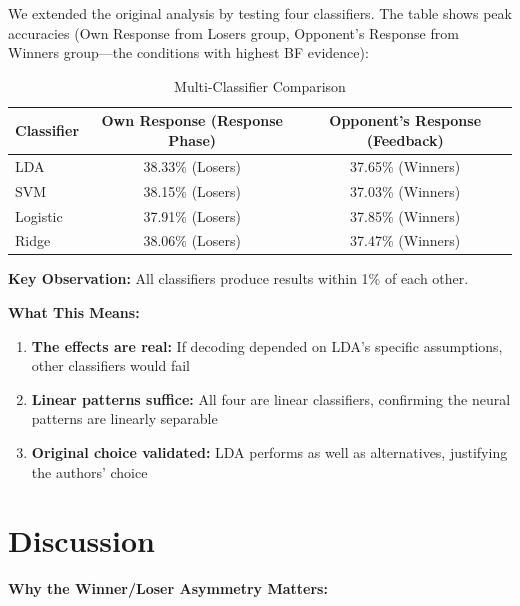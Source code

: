 \documentclass[11pt,a4paper]{article}
\newcommand{\thead}[1]{\textbf{\color{white}\sffamily #1}}
\newcommand{\theadrow}{\rowcolor{tabheader}}
\newcommand{\taltrow}{\rowcolor{softgray}}
\newenvironment{styledtable}{%
  \small\sffamily
  \renewcommand{\arraystretch}{1.35}%
}{}
\begin{document}
We extended the original analysis by testing four classifiers. The table shows peak accuracies (Own Response from Losers group, Opponent's Response from Winners group---the conditions with highest BF evidence):

\begin{table}[H]
\centering
\caption{Multi-Classifier Comparison}
\label{tab:multiclassifier}
\begin{styledtable}
\begin{tabular}{@{} l c c @{}}
\theadrow
\thead{Classifier} & \thead{Own Response (Response Phase)} & \thead{Opponent's Response (Feedback)} \\
\midrule
LDA & 38.33\% (Losers) & 37.65\% (Winners) \\
\taltrow SVM & 38.15\% (Losers) & 37.03\% (Winners) \\
Logistic & 37.91\% (Losers) & 37.85\% (Winners) \\
\taltrow Ridge & 38.06\% (Losers) & 37.47\% (Winners) \\
\bottomrule
\end{tabular}
\end{styledtable}
\end{table}

\textbf{Key Observation:} All classifiers produce results within 1\% of each other.

\textbf{What This Means:}
\begin{enumerate}
    \item \textbf{The effects are real:} If decoding depended on LDA's specific assumptions, other classifiers would fail
    \item \textbf{Linear patterns suffice:} All four are linear classifiers, confirming the neural patterns are linearly separable
    \item \textbf{Original choice validated:} LDA performs as well as alternatives, justifying the authors' choice
\end{enumerate}


\section{Discussion}
\label{sec:discussion}

\textbf{Why the Winner/Loser Asymmetry Matters:}
\end{document}
